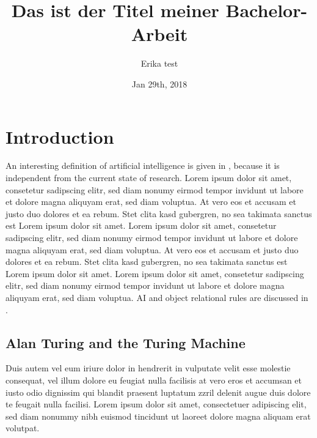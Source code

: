 \documentclass[11pt,twoside,a4paper,titlepage]{article}
\title{{Das ist der Titel meiner Bachelor-Arbeit}}
\author{Erika test}
\date{Jan 29th, 2018}
\begin{document}
\setlength{\parindent}{0pt}


\cleardoublepage

\pagestyle{fancy}




\newpage


\tableofcontents
\cleardoublepage

\fancyhead[RO,LE]{\nouppercase{\leftmark}}
\fancyfoot[RO,LE]{\thepage}

\renewcommand{\headrulewidth}{0.5pt}

\setcounter{page}{1}

\newpage

\section{Introduction}

An interesting definition of artificial intelligence is given in \cite{Rich:MCG1983}, because it is independent from the current state of research. Lorem ipsum dolor sit amet, consetetur sadipscing elitr, sed diam nonumy eirmod tempor invidunt ut labore et dolore magna aliquyam erat, sed diam voluptua. At vero eos et accusam et justo duo dolores et ea rebum. Stet clita kasd gubergren, no sea takimata sanctus est Lorem ipsum dolor sit amet. Lorem ipsum dolor sit amet, consetetur sadipscing elitr, sed diam nonumy eirmod tempor invidunt ut labore et dolore magna aliquyam erat, sed diam voluptua. At vero eos et accusam et justo duo dolores et ea rebum. Stet clita kasd gubergren, no sea takimata sanctus est Lorem ipsum dolor sit amet. Lorem ipsum dolor sit amet, consetetur sadipscing elitr, sed diam nonumy eirmod tempor invidunt ut labore et dolore magna aliquyam erat, sed diam voluptua. AI and object relational rules are discussed in \cite{Kaelbling:AAAI2001}. \\  

\subsection{Alan Turing and the Turing Machine}

Duis autem vel eum iriure dolor in hendrerit in vulputate velit esse molestie consequat, vel illum dolore eu feugiat nulla facilisis at vero eros et accumsan et iusto odio dignissim qui blandit praesent luptatum zzril delenit augue duis dolore te feugait nulla facilisi. Lorem ipsum dolor sit amet, consectetuer adipiscing elit, sed diam nonummy nibh euismod tincidunt ut laoreet dolore magna aliquam erat volutpat.\\
\end{document}
